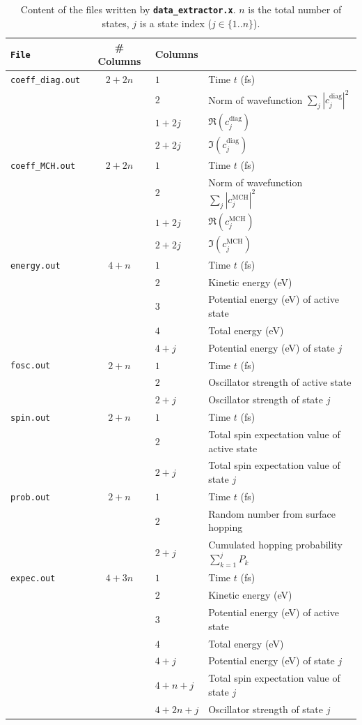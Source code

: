 \documentclass[a4paper,11pt,DIV=15,openany,twoside=false]{scrbook}
\newcommand{\ttt}[1]{\textbf{\texttt{#1}}}
\begin{document}
\begin{table}
  \centering
  \caption{Content of the files written by \ttt{data\_extractor.x}. $n$ is the total number of states, $j$ is a state index ($j\in\{1..n\}$).}
  \label{tab:outputdata}
  \begin{tabular}{>{\tt}lcll}
    \toprule
    File  &\# Columns     &\multicolumn{2}{l}{Columns}\\
    \midrule
    coeff\_diag.out       &$2+2n$
      &$1$ &Time $t$ (fs)\\
      &&$2$ &Norm of wavefunction $\sum_j |c_j^{\text{diag}}|^2$\\
      &&$1+2j$ &$\Re (c_j^{\text{diag}})$\\
      &&$2+2j$ &$\Im (c_j^{\text{diag}})$\\
    coeff\_MCH.out       &$2+2n$
      &$1$ &Time $t$ (fs)\\
      &&$2$ &Norm of wavefunction $\sum_j |c_j^{\text{MCH}}|^2$\\
      &&$1+2j$ &$\Re (c_j^{\text{MCH}})$\\
      &&$2+2j$ &$\Im (c_j^{\text{MCH}})$\\
    energy.out       &$4+n$
      &$1$ &Time $t$ (fs)\\
      &&$2$ &Kinetic energy (eV)\\
      &&$3$ &Potential energy (eV) of active state\\
      &&$4$ &Total energy (eV)\\
      &&$4+j$ &Potential energy (eV) of state $j$\\
    fosc.out       &$2+n$
      &$1$ &Time $t$ (fs)\\
      &&$2$ &Oscillator strength of active state\\
      &&$2+j$ &Oscillator strength of state $j$\\
    spin.out       &$2+n$
      &$1$ &Time $t$ (fs)\\
      &&$2$ &Total spin expectation value of active state\\
      &&$2+j$ &Total spin expectation value of state $j$\\
    prob.out       &$2+n$
      &$1$ &Time $t$ (fs)\\
      &&$2$ &Random number from surface hopping\\
      &&$2+j$ &Cumulated hopping probability $\sum_{k=1}^j P_k$\\
    expec.out      &$4+3n$
      &$1$ &Time $t$ (fs)\\
      &&$2$ &Kinetic energy (eV)\\
      &&$3$ &Potential energy (eV) of active state\\
      &&$4$ &Total energy (eV)\\
      &&$4+j$ &Potential energy (eV) of state $j$\\
      &&$4+n+j$ &Total spin expectation value of state $j$\\
      &&$4+2n+j$ &Oscillator strength of state $j$\\
    \bottomrule
  \end{tabular}
\end{table}
\end{document}
